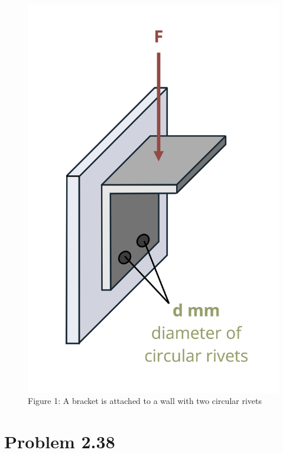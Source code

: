 \documentclass[
  letterpaper,
  DIV=11,
  numbers=noendperiod]{scrreprt}
\begin{document}
\begin{figure}[H]

{\centering \includegraphics{images/165.png}

}

\caption{Figure 1: A bracket is attached to a wall with two circular
rivets}

\end{figure}%

\chapter*{Problem 2.38}\label{problem-2.38-1}

\end{document}
